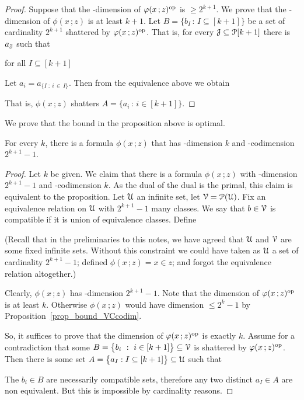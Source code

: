\documentclass[scombinatorics.tex]{subfiles}
\begin{document}
\begin{proof}
  Suppose that the \vc-dimension of $\phi(x\,;z)^{\rm op}$ is $\ge 2^{k+1}$.
  We prove that the \vc-dimension of $\phi(x\,;z)$ is at least $k+1$.
  Let $B=\big\{b_I\,:\,I\subseteq [k+1]\big\}$ be a set of cardinality $2^{k+1}$ shattered by $\phi(x\,;z)^{\rm op}$. 
  That is, for every $\J\subseteq \P[k+1]$ there is $a_\J$ such that
  
  \hfill for all $I\subseteq [k+1]$
  
  Let $a_i=a_{\{I\; :\ i\,\in\, I\}}$. Then from the equivalence above we obtain
  
  
  That is, $\phi(x\,;z)$ shatters $A=\big\{a_i\,:\, i\in [k+1]\big\}$.
\end{proof}

We prove that the bound in the proposition above is optimal.

\begin{proposition}
  For every $k$, there is a formula $\phi(x\,;z)$ that has \vc-dimension $k$ and \vc-codimension $2^{k+1}-1$.
\end{proposition}
\begin{proof}
  Let $k$ be given.
  We claim that there is a formula $\phi(x\,;z)$ with \vc-dimension $2^{k+1}-1$ and \vc-codimension $k$.
  As the dual of the dual is the primal, this claim is equivalent to the proposition.
  Let $\U$ an infinite set, let $\V=\P(\U)$.
  Fix an equivalence relation on $\U$ with $2^{k+1}-1$ many classes.
  We say that $b\in\V$ is compatible if it is union of equivalence classes.
  Define
  
  
  (Recall that in the preliminaries to this notes, we have agreed that $\U$ and $\V$ are some fixed infinite sets. Without this constraint we could have taken as $\U$ a set of cardinality $2^{k+1}-1$; defined $\phi(x\,;z)=x\in z$; and forgot the equivalence relation altogether.)

  Clearly, $\phi(x\,;z)$ has \vc-dimension $2^{k+1}-1$.
  Note that the dimension of $\phi(x\,;z)^{\rm op}$ is at least $k$.
  Otherwise $\phi(x\,;z)$ would have dimension $\le2^k-1$ by Proposition~\ref{prop_bound_VCcodim}.
  
  So, it suffices to prove that the dimension of $\phi(x\,;z)^{\rm op}$ is exactly $k$.
  Assume for a contradiction that some $B=\big\{b_i\ :\ i\in[k+1]\big\}\subseteq\V$ is shattered by $\phi(x\,;z)^{\rm op}$.
  Then there is some set $A=\big\{a_I:I\subseteq[k+1]\big\}\subseteq\U$ such that
  

  The $b_i\in B$ are necessarily compatible sets, therefore any two distinct $a_I\in A$ are non equivalent.
  But this is impossible by cardinality reasons.
\end{proof}
\end{document}
